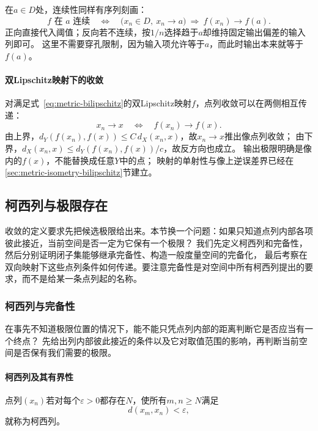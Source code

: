 在$a\in D$处，连续性同样有序列刻画：
\begin{equation}
\label{eq:metric-continuity-sequential}
  f\text{ 在 }a\text{ 连续}
  \quad\Longleftrightarrow\quad
  \bigl(x_n\in D,\ x_n\to a\bigr)\ \Longrightarrow\ f(x_n)\to f(a).
\end{equation}
正向直接代入阈值；反向若不连续，按$1/n$选择趋于$a$却维持固定输出偏差的输入列即可。
这里不需要穿孔限制，因为输入项允许等于$a$，而此时输出本来就等于$f(a)$。

\paragraph{双Lipschitz映射下的收敛}

对满足式~\eqref{eq:metric-bilipschitz}的双Lipschitz映射$f$，点列收敛可以在两侧相互传递：
\[
  x_n\to x\quad\Longleftrightarrow\quad f(x_n)\to f(x).
\]
由上界，$d_Y(f(x_n),f(x))\leq C\,d_X(x_n,x)$，故$x_n\to x$推出像点列收敛；
由下界，$d_X(x_n,x)\leq d_Y(f(x_n),f(x))/c$，故反方向也成立。
输出极限明确是像内的$f(x)$，不能替换成任意$Y$中的点；
映射的单射性与像上逆误差界已经在\ref{sec:metric-isometry-bilipschitz}节建立。

\subsection{柯西列与极限存在}
\label{sec:metric-completeness}

收敛的定义要求先把候选极限给出来。本节换一个问题：如果只知道点列内部各项彼此接近，当前空间是否一定为它保有一个极限？
我们先定义柯西列和完备性，然后分别证明闭子集能够继承完备性、构造一般度量空间的完备化，
最后考察在双向映射下这些点列条件如何传递。要注意完备性是对空间中所有柯西列提出的要求，而不是给某一条点列起的名称。

\subsubsection{柯西列与完备性}
\label{sec:metric-cauchy-completeness}

在事先不知道极限位置的情况下，能不能只凭点列内部的距离判断它是否应当有一个终点？
先给出列内部彼此接近的条件以及它对取值范围的影响，再判断当前空间是否保有我们需要的极限。

\paragraph{柯西列及其有界性}

\begin{definition}[柯西列]
\label{def:metric-cauchy}
点列$(x_n)$若对每个$\varepsilon>0$都存在$N$，使所有$m,n\geq N$满足
\[
  d(x_m,x_n)<\varepsilon,
\]
就称为柯西列。
\end{definition}


